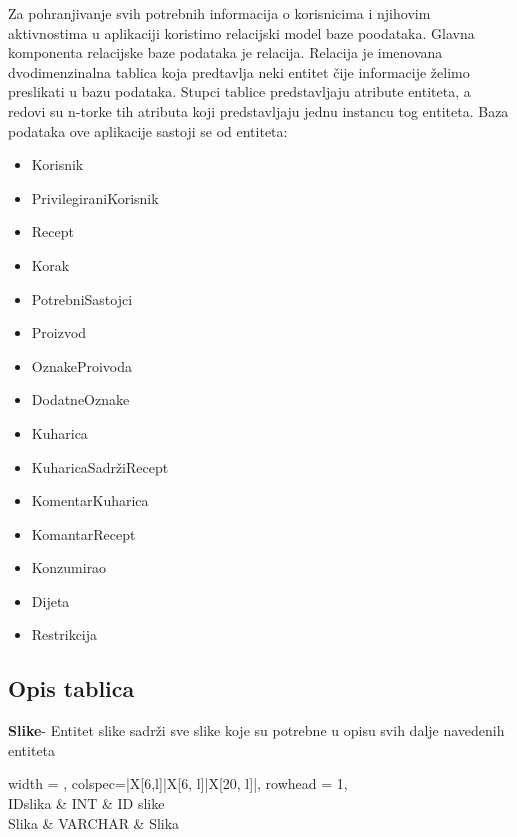 			
Za pohranjivanje svih potrebnih informacija o korisnicima i njihovim aktivnostima u aplikaciji koristimo relacijski model baze poodataka. Glavna komponenta relacijske baze podataka je relacija. Relacija je imenovana dvodimenzinalna tablica koja predtavlja neki entitet čije informacije želimo preslikati u bazu podataka. Stupci tablice predstavljaju atribute entiteta, a redovi su n-torke tih atributa koji predstavljaju jednu instancu tog entiteta. Baza podataka ove aplikacije sastoji se od entiteta:
\begin{itemize}
\item Korisnik
\item PrivilegiraniKorisnik
\item Recept
\item Korak
\item PotrebniSastojci
\item Proizvod
\item OznakeProivoda
\item DodatneOznake
\item Kuharica
\item KuharicaSadržiRecept
\item KomentarKuharica
\item KomantarRecept
\item Konzumirao
\item Dijeta
\item Restrikcija
\end{itemize}

			\subsection{Opis tablica}
			

		
				
\textbf{Slike}- Entitet slike sadrži sve slike koje su potrebne u opisu svih dalje navedenih entiteta
\begin{longtblr}[
					label=none,
					entry=none
					]{
						width = \textwidth,
						colspec={|X[6,l]|X[6, l]|X[20, l]|}, 
						rowhead = 1,
					}
					\hline {} \\ \hline[3pt]
					IDslika & INT & ID slike \\ \hline
					Slika & VARCHAR & Slika \\ \hline
				\end{longtblr}

